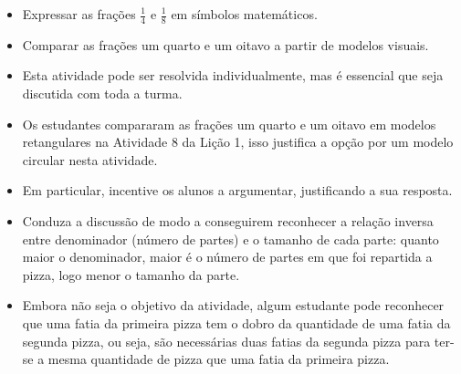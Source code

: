 \begin{multicols}{2}
\begin{solucao}{}{}
\end{solucao}


\begin{objetivos}[label=chap2-ativ7]{}{}
  \begin{itemize} %
	\item Expressar as frações $\frac{1}{4}$ e $\frac{1}{8}$ em símbolos matemáticos.
	\item Comparar as frações um quarto e um oitavo a partir de modelos visuais.
\end{itemize} %
\end{objetivos}

\begin{orientacoes}

\begin{itemize} %
    \item Esta atividade pode ser resolvida individualmente, mas é essencial que seja discutida com toda a turma.
    \item Os estudantes compararam as frações um quarto e um oitavo em modelos retangulares na Atividade 8 da Lição 1, isso justifica a opção por um modelo circular nesta atividade.
    \item Em particular, incentive os alunos a argumentar, justificando a sua resposta.
    \item Conduza a discussão de modo a conseguirem reconhecer a relação inversa entre denominador (número de partes) e o tamanho de cada parte: quanto maior o denominador, maior é o número de partes em que foi repartida a pizza, logo menor o tamanho da parte.
      \item Embora não seja o objetivo da atividade, algum estudante pode reconhecer que uma fatia da primeira pizza tem o dobro da quantidade de uma fatia da segunda  pizza, ou seja, são necessárias duas fatias da segunda pizza para ter-se a mesma quantidade de pizza que uma fatia da primeira pizza.
\end{itemize}




\end{orientacoes}
\end{multicols}
